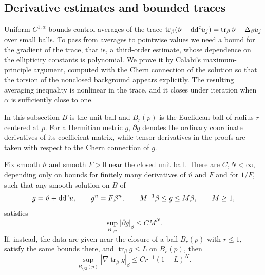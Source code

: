 \subsection{Derivative estimates and bounded traces}\label{sec:interior-calabi}

Uniform $C^{1,\alpha}$ bounds control averages of the trace $\operatorname{tr}_\beta(\vartheta+\mathrm{dd}^{\mathrm{c}} u_j)=\operatorname{tr}_\beta\vartheta+\Delta_\beta u_j$ over small balls. To pass from averages to pointwise values we need a bound for the gradient of the trace, that is, a third-order estimate, whose dependence on the ellipticity constants is polynomial. We prove it by Calabi's maximum-principle argument, computed with the Chern connection of the solution so that the torsion of the nonclosed background appears explicitly. The resulting averaging inequality is nonlinear in the trace, and it closes under iteration when $\alpha$ is sufficiently close to one.

In this subsection $B$ is the unit ball and $B_r(p)$ is the Euclidean ball of radius $r$ centered at $p$. For a Hermitian metric $g$, $\partial g$ denotes the ordinary coordinate derivatives of its coefficient matrix, while tensor derivatives in the proofs are taken with respect to the Chern connection of $g$.

\begin{proposition}\label{prop:interior-calabi}
Fix smooth $\vartheta$ and smooth $F>0$ near the closed unit ball. There are $C,N<\infty$, depending only on bounds for finitely many derivatives of $\vartheta$ and $F$ and for $1/F$, such that any smooth solution on $B$ of
\[
  g=\vartheta+\mathrm{dd}^{\mathrm{c}} u,
  \qquad g^n=F\beta^n,
  \qquad M^{-1}\beta\leq g\leq M\beta,
  \qquad M\geq1,
\]
satisfies
\begin{equation}\label{eq:interior-calabi-polynomial}
  \sup_{B_{1/2}}|\partial g|_\beta\leq CM^N.
\end{equation}
If, instead, the data are given near the closure of a ball $B_r(p)$ with $r\leq1$, satisfy the same bounds there, and $\operatorname{tr}_\beta g\leq L$ on $B_r(p)$, then
\begin{equation}\label{eq:interior-gradient-trace-scaled}
  \sup_{B_{r/2}(p)}|\nabla\operatorname{tr}_\beta g|_\beta
  \leq Cr^{-1}(1+L)^N.
\end{equation}
\end{proposition}

